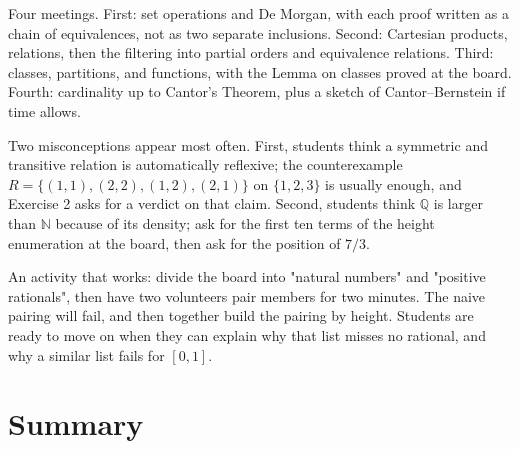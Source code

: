 \begin{untukdosen}
Four meetings. First: set operations and De Morgan, with each proof written as a chain
of equivalences, not as two separate inclusions. Second: Cartesian products,
relations, then the filtering into partial orders and equivalence relations. Third:
classes, partitions, and functions, with the Lemma on classes proved at the board.
Fourth: cardinality up to Cantor's Theorem, plus a sketch of Cantor--Bernstein if time
allows.

Two misconceptions appear most often. First, students think a symmetric and transitive
relation is automatically reflexive; the counterexample
$R = \{(1,1),(2,2),(1,2),(2,1)\}$ on $\{1,2,3\}$ is usually enough, and Exercise 2 asks
for a verdict on that claim. Second, students think $\mathbb{Q}$ is larger than
$\mathbb{N}$ because of its density; ask for the first ten terms of the height
enumeration at the board, then ask for the position of $7/3$.

An activity that works: divide the board into "natural numbers" and "positive
rationals", then have two volunteers pair members for two minutes. The naive pairing
will fail, and then together build the pairing by height. Students are ready to move on
when they can explain why that list misses no rational, and why a similar list fails
for $[0,1]$.
\end{untukdosen}

\section{Summary}


